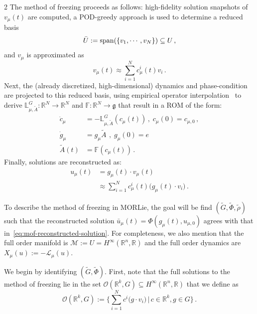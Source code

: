 \documentclass{article}
\newcommand{\M}{\mathcal{M}}                                %
\newcommand{\g}{\mathfrak{g}}                               %
\newcommand{\R}{\mathbb{R}}                                 %
\begin{document}
\begin{multicols}{2}
The method of freezing proceeds as follows:  high-fidelity solution snapshots of $v_\mu(t)$ are computed, a POD-greedy approach is used to determine a reduced basis 
\begin{equation}\label{eq:mof-reduced-basis}
    \bar{U} := \textnormal{span}(\{v_1,\cdots,v_N\}) \subseteq U\,,
\end{equation}
and $v_\mu$ is approximated as %
\begin{equation}
    v_\mu(t) \approx \sum_{i=1}^N c_\mu^i(t) v_i \,.
\end{equation} 
Next, the (already discretized, high-dimensional) dynamics and phase-condition are projected to this reduced basis, using empirical operator interpolation~\cite{Drohmann2012} to derive $\mathbb{L}^G_{\mu,\widetilde{A}}:\R^N\rightarrow\R^N$ and $\mathbb{F}:\R^N\rightarrow\g$ that result in a ROM of the form: 
\begin{align}
    \dot{c}_\mu &= - \mathbb{L}^G_{\mu,\widetilde{A}}(c_\mu(t))\,,\; c_\mu(0) = c_{\mu,0}\,, \label{eq:mof-ROM-dynamics-c}\\
    \dot{g}_\mu &= g_\mu \widetilde{A}\ \,,\; g_\mu(0) =e \label{eq:mof-ROM-dynamics-g}\\
    \widetilde{A}(t) &= \mathbb{F}(c_\mu(t))\,.
\end{align} 
Finally, solutions are reconstructed as:
\begin{align}\label{eq:mof-reconstructed-solution}
    u_\mu(t) &= g_\mu(t)\cdot v_\mu(t) \\
    & \approx \sum_{i=1}^N c_\mu^i(t)\big(g_\mu(t)\cdot v_i) \,. \nonumber
\end{align}

To describe the method of freezing in MORLie, the goal will be find $(\widetilde{G},\widetilde{\Phi},\widetilde{\rho})$ such that the reconstructed solution $\bar{u}_\mu(t) = \Phi(g_\mu(t),u_{\mu,0})$ agrees with that in~\eqref{eq:mof-reconstructed-solution}. For completeness, we also mention that the full order manifold is $\M := U =  H^\infty(\R^n,\R)$ and the full order dynamics are $X_\mu(u) := -\mathcal{L}_\mu(u)$.

We begin by identifying $(\widetilde{G},\widetilde{\Phi})$. First, note that the full solutions to the method of freezing lie in the set $\mathcal{O}(\R^k,G) \subseteq H^\infty(\R^n,\R)$ that we define as 
\begin{equation}\label{eq:mof-reachable-subset}
    \mathcal{O}(\R^k,G) := \bigg\{ \sum_{i=1}^N c^i\big(g\cdot v_i)\,|\, c \in \R^k, g \in G \bigg\} \,.
\end{equation}  


\end{multicols}
\end{document}
